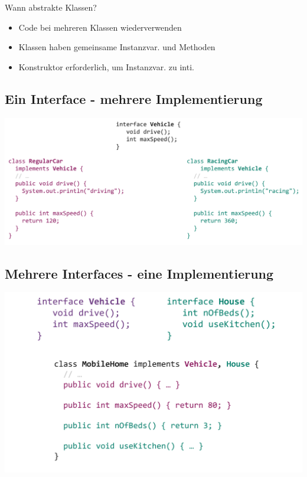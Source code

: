 Wann abstrakte Klassen?
\begin{itemize}
    \itemsep0em
    \item Code bei mehreren Klassen wiederverwenden
    \item Klassen haben gemeinsame Instanzvar. und Methoden
    \item Konstruktor erforderlich, um Instanzvar. zu inti.
\end{itemize}

\subsection{Ein Interface - mehrere Implementierung}
\begin{center}
    \includegraphics[width=0.9\columnwidth]{pictures/interface1-class2.png}
\end{center}

\subsection{Mehrere Interfaces - eine Implementierung}
\begin{center}
    \includegraphics[width=0.9\columnwidth]{pictures/interface2-class1.png}
\end{center}
